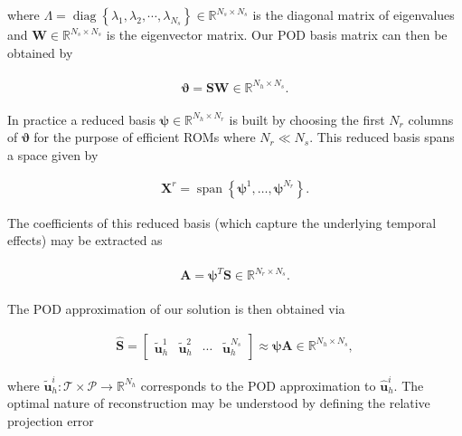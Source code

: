 \documentclass[preprint,12pt]{elsarticle}
\begin{document}
where $\Lambda = \operatorname{diag}\left\{\lambda_{1}, \lambda_{2}, \cdots, \lambda_{N_{s}}\right\} \in \mathbb{R}^{N_{s} \times N_{s}}$ is the diagonal matrix of eigenvalues and $\mathbf{W} \in \mathbb{R}^{N_{s} \times N_{s}}$ is the eigenvector matrix. Our POD basis matrix can then be obtained by
\begin{linenomath*}
\begin{align}
\begin{gathered}
\boldsymbol{\vartheta} = \mathbf{S} \mathbf{W} \in \mathbb{R}^{N_h \times N_s}.
\end{gathered}
\end{align}
\end{linenomath*}
In practice a reduced basis $\boldsymbol{\psi} \in \mathbb{R}^{N_h \times N_r}$ is built by choosing the first $N_r$ columns of $\boldsymbol{\vartheta}$ for the purpose of efficient ROMs where $N_r \ll N_s$. This reduced basis spans a space given by
\begin{linenomath*}
\begin{align}
\mathbf{X}^{r}=\operatorname{span}\left\{\boldsymbol{\psi}^{1}, \dots, \boldsymbol{\psi}^{N_r}\right\}.
\end{align}
\end{linenomath*}
The coefficients of this reduced basis (which capture the underlying temporal effects) may be extracted as
\begin{linenomath*}
\begin{align}
\begin{gathered}
\mathbf{A} = \boldsymbol{\psi}^{T} \mathbf{S} \in \mathbb{R}^{N_r \times N_s}.
\end{gathered}
\end{align}
\end{linenomath*}
The POD approximation of our solution is then obtained via
\begin{linenomath*}
\begin{align}
\hat{\mathbf{S}} =  [\begin{array}{c|c|c|c}{\tilde{\mathbf{u}}^{1}_h} & {\tilde{\mathbf{u}}^{2}_h} & {\cdots} & {\tilde{\mathbf{u}}^{N_{s}}_h}\end{array}] \approx \boldsymbol{\psi} \mathbf{A} \in \mathbb{R}^{N_h \times N_s},
\end{align}
\end{linenomath*}
where $\tilde{\mathbf{u}}_h^i : \mathcal{T} \times \mathcal{P} \rightarrow \mathbb{R}^{N_h}$ corresponds to the POD approximation to $\hat{\mathbf{u}}_h^i$. The optimal nature of reconstruction may be understood by defining the relative projection error
\end{document}
